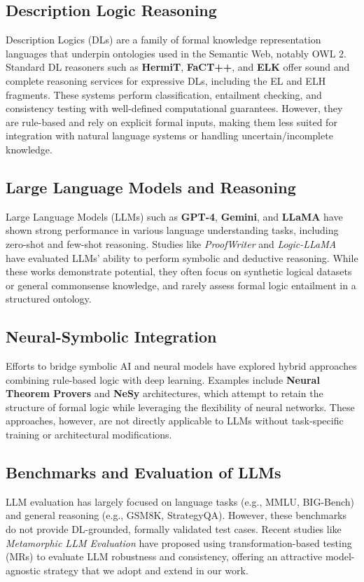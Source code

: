 \documentclass[11pt]{article}
\begin{document}
\subsection{Description Logic Reasoning}
Description Logics (DLs) are a family of formal knowledge representation languages that underpin ontologies used in the Semantic Web, notably OWL 2. Standard DL reasoners such as \textbf{HermiT}, \textbf{FaCT++}, and \textbf{ELK} offer sound and complete reasoning services for expressive DLs, including the EL and ELH fragments. These systems perform classification, entailment checking, and consistency testing with well-defined computational guarantees. However, they are rule-based and rely on explicit formal inputs, making them less suited for integration with natural language systems or handling uncertain/incomplete knowledge.

\subsection{Large Language Models and Reasoning}
Large Language Models (LLMs) such as \textbf{GPT-4}, \textbf{Gemini}, and \textbf{LLaMA} have shown strong performance in various language understanding tasks, including zero-shot and few-shot reasoning. Studies like \textit{ProofWriter} and \textit{Logic-LLaMA} have evaluated LLMs' ability to perform symbolic and deductive reasoning. While these works demonstrate potential, they often focus on synthetic logical datasets or general commonsense knowledge, and rarely assess formal logic entailment in a structured ontology.

\subsection{Neural-Symbolic Integration}
Efforts to bridge symbolic AI and neural models have explored hybrid approaches combining rule-based logic with deep learning. Examples include \textbf{Neural Theorem Provers} and \textbf{NeSy} architectures, which attempt to retain the structure of formal logic while leveraging the flexibility of neural networks. These approaches, however, are not directly applicable to LLMs without task-specific training or architectural modifications.

\subsection{Benchmarks and Evaluation of LLMs}
LLM evaluation has largely focused on language tasks (e.g., MMLU, BIG-Bench) and general reasoning (e.g., GSM8K, StrategyQA). However, these benchmarks do not provide DL-grounded, formally validated test cases. Recent studies like \textit{Metamorphic LLM Evaluation} have proposed using transformation-based testing (MRs) to evaluate LLM robustness and consistency, offering an attractive model-agnostic strategy that we adopt and extend in our work.
\end{document}
